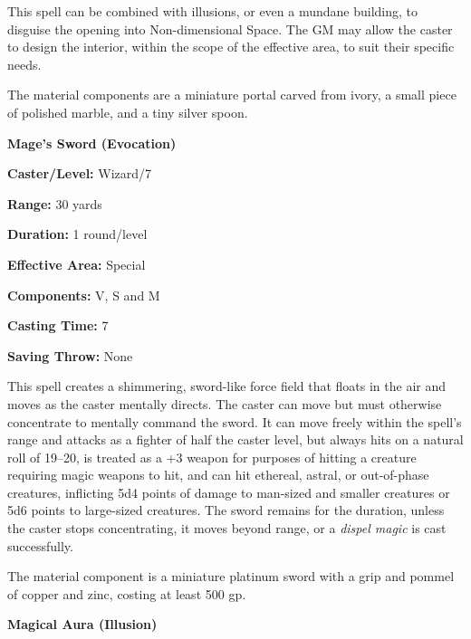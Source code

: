 \begin{multicols}{2}
This spell can be combined with illusions, or even a mundane building, to disguise the opening into Non-dimensional Space.  The GM may allow the caster to design the interior, within the scope of the effective area, to suit their specific needs.

The material components are a miniature portal carved from ivory, a small piece of polished marble, and a tiny silver spoon.

\vspace{1em}

\noindent
\begin{minipage}{\columnwidth}

\noindent \textbf{Mage's Sword (Evocation)}

\noindent \textbf{Caster/Level:} Wizard/7

\noindent \textbf{Range:} 30 yards

\noindent \textbf{Duration:} 1 round/level

\noindent \textbf{Effective Area:} Special

\noindent \textbf{Components:} V, S and M

\noindent \textbf{Casting Time:} 7

\noindent \textbf{Saving Throw:} None

\end{minipage}

This spell creates a shimmering, sword-like force field that floats in the air and moves as the caster mentally directs.  The caster can move but must otherwise concentrate to mentally command the sword.  It can move freely within the spell's range and attacks as a fighter of half the caster level, but always hits on a natural roll of 19--20, is treated as a +3 weapon for purposes of hitting a creature requiring magic weapons to hit, and can hit ethereal, astral, or out-of-phase creatures, inflicting 5d4 points of damage to man-sized and smaller creatures or 5d6 points to large-sized creatures.  The sword remains for the duration, unless the caster stops concentrating, it moves beyond range, or a \textit{dispel magic} is cast successfully.

The material component is a miniature platinum sword with a grip and pommel of copper and zinc, costing at least 500 gp.

\vspace{1em}

\noindent
\begin{minipage}{\columnwidth}

\noindent \textbf{Magical Aura (Illusion)}


\end{minipage}
\end{multicols}
